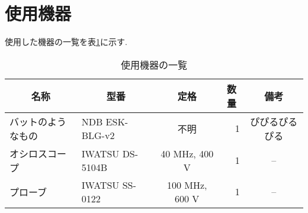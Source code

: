 \section{使用機器}
\label{sec:equipments}
使用した機器の一覧を表\ref{tab:equipments}に示す.
\begin{table}[htbp]
    \centering
    \caption{使用機器の一覧}
    \label{tab:equipments}
    \begin{tabular}{|l|l|c|r|c|}
        \hline
        \multicolumn{1}{|c|}{名称} & \multicolumn{1}{c|}{型番} & 定格           & \multicolumn{1}{c|}{数量} & \multicolumn{1}{c|}{備考} \\ \hline\hline
        バットのようなもの         & NDB ESK-BLG-v2            & 不明           & 1                         & ぴぴるぴるぴる            \\ \hline
        オシロスコープ             & IWATSU DS-5104B           & 40 MHz, 400 V  & 1                         & --                        \\ \hline
        プローブ                   & IWATSU SS-0122            & 100 MHz, 600 V & 1                         & --                        \\ \hline
    \end{tabular}
\end{table}
